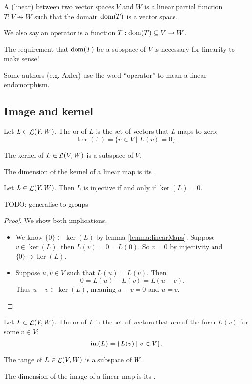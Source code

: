 \begin{definition}
A (linear)  between two vector spaces $V$ and $W$ is a linear partial function $T: V \not\to W$ such that the domain $\operatorname{dom}(T)$ is a vector space.

We also say an operator is a function $T: \operatorname{dom}(T)\subseteq V\to W$.
\end{definition}
The requirement that $\operatorname{dom}(T)$ be a subspace of $V$ is necessary for linearity to make sense!

Some authors (e.g. Axler) use the word ``operator'' to mean a linear endomorphism.

\subsection{Image and kernel}
\begin{definition}
Let $L \in \mathop{\mathcal{L}}(V,W)$. The  or  of $L$ is the set of vectors that $L$ maps to zero:
\[ \ker(L) = \{ v\in V \;|\; L(v) = 0 \}. \]
\end{definition}
\begin{proposition}
The kernel of $L\in \mathop{\mathcal{L}}(V,W)$ is a subspace of $V$.
\end{proposition}
\begin{definition}
The dimension of the kernel of a linear map is its .
\end{definition}
\begin{proposition} \label{prop:injectivityKernelTriviality}
Let $L\in\mathop{\mathcal{L}}(V,W)$. Then $L$ is injective if and only if $\ker(L) = 0$.
\end{proposition}
TODO: generalise to groups
\begin{proof}
We show both implications.
\begin{itemize}
\item[\boxed{\Rightarrow}] We know $\{0\}\subset \ker(L)$ by lemma \ref{lemma:linearMaps}. Suppose $v\in \ker(L)$, then $L(v) = 0 = L(0)$. So $v=0$ by injectivity and $\{0\}\supset \ker(L)$.
\item[\boxed{\Leftarrow}] Suppose $u,v \in V$ such that $L(u)=L(v)$. Then
\[ 0 = L(u) - L(v) = L(u-v). \]
Thus $u-v\in \ker(L)$, meaning $u-v = 0$ and $u=v$.
\end{itemize}
\end{proof}

\begin{definition}
Let $L \in \mathop{\mathcal{L}}(V,W)$. The  or  of $L$ is the set of vectors that are of the form $L(v)$ for some $v\in V$:
\[ \operatorname{im}(L) = \{ L(v) \;|\; v\in V \}. \]
\end{definition}
\begin{proposition}
The range of $L\in \mathop{\mathcal{L}}(V,W)$ is a subspace of $W$.
\end{proposition}
\begin{definition}
The dimension of the image of a linear map is its .
\end{definition}

